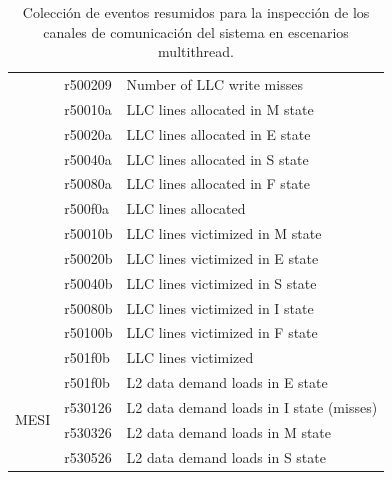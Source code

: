 \begin{table}[]
\begin{tabular}{|l|l|l|}
                                    & r500209  & Number of LLC write misses                                 \\ \cline{2-3} 
                                    & r50010a  & LLC lines allocated in M state                             \\ \cline{2-3} 
                                    & r50020a  & LLC lines allocated in E state                             \\ \cline{2-3} 
                                    & r50040a  & LLC lines allocated in S state                             \\ \cline{2-3} 
                                    & r50080a  & LLC lines allocated in F state                             \\ \cline{2-3} 
                                    & r500f0a  & LLC lines allocated                                        \\ \cline{2-3} 
                                    & r50010b  & LLC lines victimized in M state                            \\ \cline{2-3} 
                                    & r50020b  & LLC lines victimized in E state                            \\ \cline{2-3} 
                                    & r50040b  & LLC lines victimized in S state                            \\ \cline{2-3} 
                                    & r50080b  & LLC lines victimized in I state                            \\ \cline{2-3} 
                                    & r50100b  & LLC lines victimized in F state                            \\ \cline{2-3} 
                                    & r501f0b  & LLC lines victimized                                       \\ \hline
\multirow{4}{*}{MESI}               & r501f0b  & L2 data demand loads in E state                            \\ \cline{2-3} 
                                    & r530126  & L2 data demand loads in I state (misses)                   \\ \cline{2-3} 
                                    & r530326  & L2 data demand loads in M state                            \\ \cline{2-3} 
                                    & r530526  & L2 data demand loads in S state                            \\ \hline
\end{tabular}
\caption{Colección de eventos resumidos para la inspección de los canales de comunicación del sistema en escenarios multithread.}
\label{table:codigoseventos}
\end{table}

